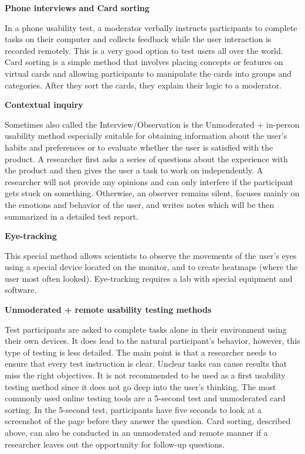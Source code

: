 \documentclass[a4paper,10pt,twoside]{article}
\begin{document}
\smallskip

\noindent \textbf {Phone interviews and Card sorting}

\noindent In a phone usability test, a moderator verbally instructs
participants to complete tasks on their computer and collects feedback
while the user interaction is recorded remotely. This is a very good
option to test users all over the world. Card sorting is a simple
method that involves placing concepts or features on virtual cards and
allowing participants to manipulate the cards into groups and
categories. After they sort the cards, they explain their logic to a
moderator.

\smallskip

\noindent \textbf {Contextual inquiry}

\noindent Sometimes also called the Interview/Observation is the
Unmoderated + in-person usability method especially suitable for
obtaining information about the user's habits and preferences or to
evaluate whether the user is satisfied with the product. A researcher
first asks a series of questions about the experience with the product
and then gives the user a task to work on independently. A researcher
will not provide any opinions and can only interfere if the
participant gets stuck on something. Otherwise, an observer remains
silent, focuses mainly on the emotions and behavior of the user, and
writes notes which will be then summarized in a detailed test report.

\smallskip

\noindent \textbf {Eye-tracking}

\noindent This special method allows scientists to observe the
movements of the user's eyes using a special device located on the
monitor, and to create heatmaps (where the user most often
looked). Eye-tracking requires a lab with special equipment and
software.

\smallskip

\noindent \textbf {Unmoderated + remote usability testing methods}

\noindent Test participants are asked to complete tasks alone in their
environment using their own devices. It does lead to the natural
participant's behavior, however, this type of testing is less
detailed. The main point is that a researcher needs to ensure that
every test instruction is clear. Unclear tasks can cause results that
miss the right objectives. It is not recommended to be used as a first
usability testing method since it does not go deep into the user’s
thinking. The most commonly used online testing tools are a 5-second
test and unmoderated card sorting. In the 5-second test, participants
have five seconds to look at a screenshot of the page before they
answer the question. Card sorting, described above, can also be
conducted in an unmoderated and remote manner if a researcher leaves
out the opportunity for follow-up questions.
\end{document}
